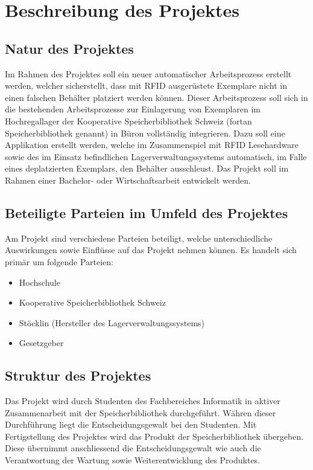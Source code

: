 \chapter{Beschreibung des Projektes}

\section{Natur des Projektes}
Im Rahmen des Projektes soll ein neuer automatischer Arbeitsprozess erstellt werden, welcher sicherstellt, dass mit RFID ausgerüstete Exemplare nicht in einen falschen Behälter platziert werden können. Dieser Arbeitsprozess soll sich in die bestehenden Arbeitsprozesse zur Einlagerung von Exemplaren im Hochregallager der Kooperative Speicherbibliothek Schweiz (fortan Speicherbibliothek genannt) in Büron vollständig integrieren. Dazu soll eine Applikation erstellt werden, welche im Zusammenspiel mit RFID Lesehardware sowie des im Einsatz befindlichen Lagerverwaltungssystems automatisch, im Falle eines deplatzierten Exemplars, den Behälter ausschleust. Das Projekt soll im Rahmen einer Bachelor- oder Wirtschaftsarbeit entwickelt werden.

\section{Beteiligte Parteien im Umfeld des Projektes}
Am Projekt sind verschiedene Parteien beteiligt, welche unterschiedliche Auswirkungen sowie Einflüsse auf das Projekt nehmen können. Es handelt sich primär um folgende Parteien:
\begin{itemize}
	\item Hochschule
	\item Kooperative Speicherbibliothek Schweiz
	\item Stöcklin (Hersteller des Lagerverwaltungssystems)
	\item Gesetzgeber
\end{itemize}

\section{Struktur des Projektes}
Das Projekt wird durch Studenten des Fachbereiches Informatik in aktiver Zusammenarbeit mit der Speicherbibliothek durchgeführt. Währen dieser Durchführung liegt die Entscheidungsgewalt bei den Studenten. Mit Fertigstellung des Projektes wird das Produkt der Speicherbibliothek übergeben. Diese übernimmt anschliessend die Entscheidungsgewalt wie auch die Verantwortung der Wartung sowie Weiterentwicklung des Produktes.

